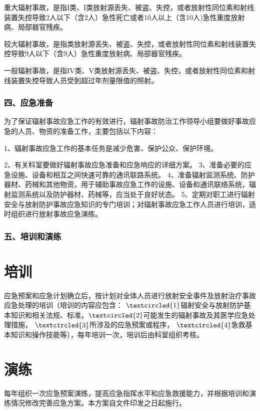 重大辐射事故，是指I类、I类放射源丢失、被盗、失控，或者放射性同位素和射线装置失控导致2人以下（含2人）急性死亡或者10人以上（含10人)急性重度放射病、局部器官残疾。

较大辐射事故，是指类放射源丢失、被盗、失控，或者放射性同位素和射线装置失控导致9人以下（含9人）急性重度放射病、局部器官残疾。

一般辐射事故，是指IV类、V类放射源丢失、被盗、失控，或者放射性同位素和射线装置失控导致人员受到超过年剂量限值的照射。

\subsubsection{四、应急准备}

为了保证辐射事故应急工作的有效进行，辐射事故防治工作领导小组要做好事故应急的人员、物资的准备工作，主要包括以下内容：

1、辐射事故应急工作的基本任务是减少危害、保护公众、保护环境。

2、有关科室要做好辐射事故应急准备和应急响应的详细方案。
3、准备必要的应急设施、设备和相互之间快速可靠的通讯联路系统。
4、准备辐射监测系统、防护器材、药械和其他物资，用于辅助事故应急工作的设施、设备和通讯联络系统，辐射监测系统以及防护器材、药械等，应当处于良好状态。
5、定期对职工进行辐射安全与放射防护事故应急知识的专门培训；对辐射事故应急工作人员进行培训，适时组织进行放射事故应急演练。

\subsubsection{五、培训和演练}

\section{培训}

应急预案和应急计划确立后，按计划对全体人员进行放射安全事件及放射治疗事故应急处理的培训（培训的内容应包含： $\textcircled{1}$辐射安全与放射防护基本知识和相关法规、标准，$\textcircled{2}$可能发生的辐射事故及其医学应急处理措施， $\textcircled{3}$所涉及的应急预案或程序， $\textcircled{4}$急救基本知识和操作技能等），每年培训一次，培训后由科室组织考核。

\section{演练}

每年组织一次应急预案演练，提高应急指挥水平和应急救援能力，并根据培训和演练情况修改完善应急方案。本方案自文件印发之日起施行。

